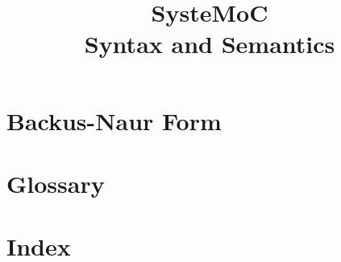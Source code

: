 \documentclass[12pt,a4paper]{report}
\title{SysteMoC\\Syntax and Semantics}
\date{}
\begin{document}
\maketitle 

\tableofcontents







\appendix

\chapter{Backus-Naur Form}

\chapter{Glossary}

\chapter{Index}
\end{document}
